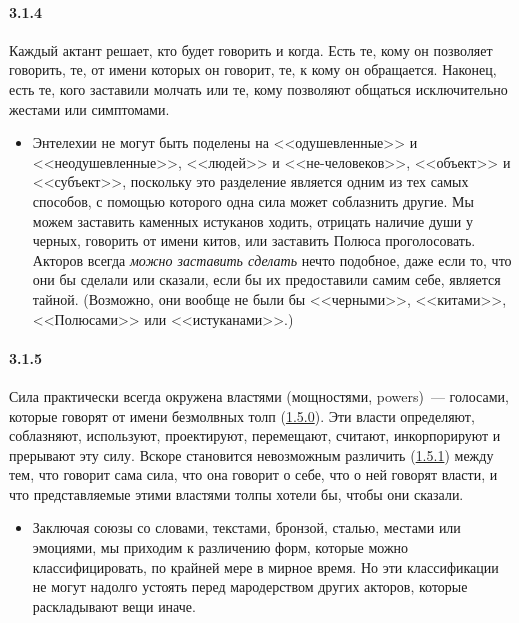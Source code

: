 \paragraph{3.1.4}\hypertarget{par:3.1.4}{} Каждый актант решает, кто будет говорить и когда. Есть те, кому он позволяет говорить, те, от имени которых он говорит, те, к кому он обращается. Наконец, есть те, кого заставили молчать или те, кому позволяют общаться исключительно жестами или
симптомами. 
	\begin{itemize}
	\item 
	Энтелехии не могут быть поделены на <<одушевленные>> и <<неодушевленные>>, <<людей>> и <<не-человеков>>, <<объект>> и <<субъект>>, поскольку это разделение является одним из тех самых способов, с помощью которого одна сила может соблазнить другие. Мы можем заставить каменных истуканов ходить, отрицать наличие души у черных, говорить от имени китов, или заставить Полюса проголосовать. Акторов всегда {\itshape можно заставить сделать} нечто подобное, даже если то, что они бы сделали или сказали, если бы их предоставили самим себе, является тайной. (Возможно, они вообще не были бы <<черными>>, <<китами>>, <<Полюсами>> или <<истуканами>>.)
	\end{itemize}

\paragraph{3.1.5}\hypertarget{par:3.1.5}{} Сила практически всегда окружена властями (мощностями, powers)~--- голосами, которые говорят от имени безмолвных толп (\hyperlink{par:1.5.0}{1.5.0}). Эти власти определяют, соблазняют,
используют, проектируют, перемещают, считают, инкорпорируют и прерывают эту силу. Вскоре становится невозможным различить (\hyperlink{par:1.5.1}{1.5.1}) между тем, что говорит сама сила, что она говорит о себе, что о ней говорят власти, и что представляемые этими властями толпы хотели бы, чтобы они сказали. 
	\begin{itemize}
	\item 
	Заключая союзы со словами, текстами, бронзой, сталью, местами или эмоциями, мы приходим к различению форм, которые можно классифицировать, по крайней мере в мирное время. Но эти классификации не могут надолго устоять перед мародерством других акторов, которые раскладывают вещи иначе.
	\end{itemize}

